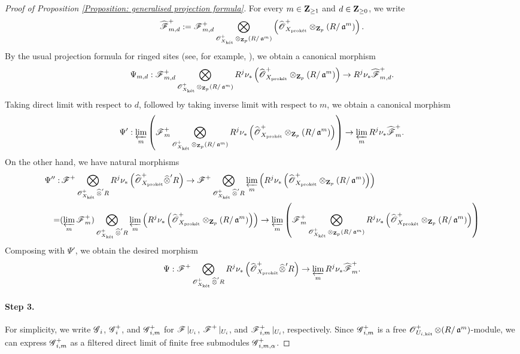 \begin{proof}[Proof of Proposition \ref{Proposition: generalised projection formula}]
For every $m\in \Z_{\geq 1}$ and $d\in \Z_{\geq 0}$, we write \[
    \widehat{\scrF}_{m, d}^+ := \scrF_{m, d}^+ \bigotimes_{\scrO_{X_{\ket}}^+\otimes_{\Z_p} (R/\fraka^m)} \left(\widehat{\scrO}_{X_{\proket}}^+ \otimes_{\Z_p} ( R/\fraka^m)\right).
\] 
By the usual projection formula for ringed sites (see, for example, \cite[01E6]{stacks-project}), we obtain a canonical morphism
$$
    \Psi_{m, d}: \scrF^+_{m, d} \bigotimes_{\scrO_{X_{\ket}}^+\otimes_{\Z_p} (R/\fraka^m)} R^j\nu_* \left(\widehat{\scrO}_{X_{\proket}}^+ \otimes_{\Z_p} ( R/\fraka^m)\right) \rightarrow R^j\nu_* \widehat{\scrF}_{m, d}^+.
$$
Taking direct limit with respect to $d$, followed by taking inverse limit with respect to $m$, we obtain a canonical morphism \[
    \Psi': \varprojlim_m\left(\scrF^+_m \bigotimes_{\scrO_{X_{\ket}}^+\otimes_{\Z_p} (R/\fraka^m)} R^j\nu_* \left(\widehat{\scrO}_{X_{\proket}}^+ \otimes_{\Z_p} (R/\fraka^m)\right) \right) \rightarrow \varprojlim_mR^j\nu_* \widehat{\scrF}_{m}^+.
\]
On the other hand, we have natural morphisms
\begin{align*}
\Psi'': &\scrF^+\bigotimes_{\scrO^+_{X_{\ket}}\widehat{\otimes}'R} R^j\nu_*\left(\widehat{\scrO}^+_{X_{\proket}}\widehat{\otimes}'R\right) \rightarrow \scrF^+\bigotimes_{\scrO^+_{X_{\ket}}\widehat{\otimes}'R} \varprojlim_m \left(R^j\nu_*\left(\widehat{\scrO}^+_{X_{\proket}}\otimes_{\Z_p} (R/\fraka^m)\right)\right)\\
=& (\varprojlim_m\scrF^+_m)\bigotimes_{\scrO^+_{X_{\ket}}\widehat{\otimes}'R} \varprojlim_m \left(R^j\nu_*\left(\widehat{\scrO}^+_{X_{\proket}}\otimes_{\Z_p} (R/\fraka^m)\right)\right)\rightarrow \varprojlim_m\left(\scrF^+_m\bigotimes_{\scrO^+_{X_{\ket}}\otimes_{\Z_p} (R/\fraka^m)}  R^j\nu_*\left(\widehat{\scrO}^+_{X_{\proket}}\otimes_{\Z_p} (R/\fraka^m)\right)\right)
\end{align*}
Composing with $\Psi'$, we obtain the desired morphism
$$
\Psi: \scrF^+\bigotimes_{\scrO^+_{X_{\ket}}\widehat{\otimes}'R} R^j\nu_*\left(\widehat{\scrO}^+_{X_{\proket}}\widehat{\otimes}'R\right)\rightarrow \varprojlim_{m}R^j\nu_{*}\widehat{\scrF}_m^+.
$$

\paragraph{Step 3.} For simplicity, we write $\scrG_i$, $\scrG^+_i$, and $\scrG^+_{i,m}$ for $\scrF|_{U_i}$, $\scrF^+|_{U_i}$, and $\scrF^+_{i,m}|_{U_i}$, respectively. Since $\scrG^+_{i,m}$ is a free $\scrO^+_{U_{i,\ket}}\otimes (R/\fraka^m)$-module, we can express $\scrG^+_{i,m}$ as a filtered direct limit of finite free submodules $\scrG^+_{i,m,\alpha}$.


\end{proof}
